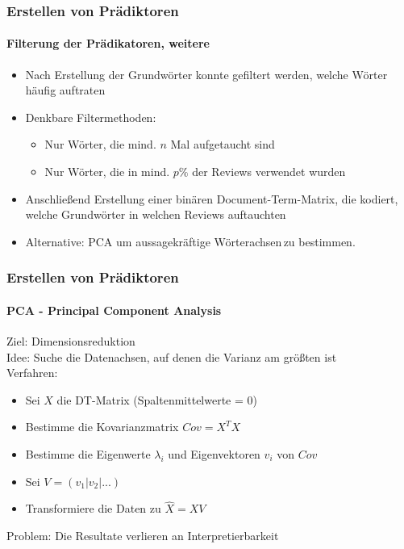 \documentclass{beamer}
\begin{document}
\begin{frame}
\frametitle{Erstellen von Prädiktoren}
\framesubtitle{Filterung der Prädikatoren, weitere}
\begin{itemize}\itemsep12pt
\item Nach Erstellung der Grundwörter konnte gefiltert werden, welche Wörter häufig auftraten
\item Denkbare Filtermethoden:
\begin{itemize}
\item Nur Wörter, die mind. $n$ Mal aufgetaucht sind 
\item Nur Wörter, die in mind. $p\%$ der Reviews verwendet wurden
\end{itemize} 
\item Anschließend Erstellung einer binären Document-Term-Matrix, die kodiert, welche Grundwörter in welchen Reviews auftauchten
\item Alternative: PCA um aussagekräftige \glqq Wörterachsen\grqq \,zu bestimmen.
\end{itemize}
\end{frame}

\begin{frame}
 \frametitle{Erstellen von Prädiktoren}
 \framesubtitle{PCA - Principal Component Analysis}
 Ziel: Dimensionsreduktion \\
 \vspace{12pt}
 Idee: Suche die Datenachsen, auf denen die Varianz am größten ist \\
 \vspace{12pt}
 Verfahren:\\
 
 \begin{itemize}
  \item Sei $X$ die DT-Matrix (Spaltenmittelwerte = 0)
  \item Bestimme die Kovarianzmatrix $Cov = X^TX$
  \item Bestimme die Eigenwerte $\lambda_i$ und Eigenvektoren $v_i$ von $Cov$
  \item Sei $V = (v_1| v_2| ...)$
  \item Transformiere die Daten zu $\hat{X} = X V$
 \end{itemize}

 \vspace{12pt}
 Problem: Die Resultate verlieren an Interpretierbarkeit
 
\end{frame}
\end{document}
